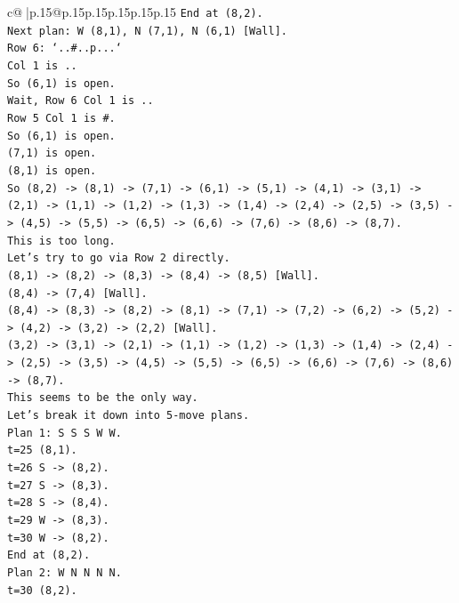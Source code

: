 \documentclass{article}
\begin{document}
{\begin{supertabular}{c@{$\;$}|p{.15\linewidth}@{}p{.15\linewidth}p{.15\linewidth}p{.15\linewidth}p{.15\linewidth}p{.15\linewidth}}
{{{\texttt{End at (8,2).} \\
\texttt{Next plan: W (8,1), N (7,1), N (6,1) {[}Wall{]}.} \\
\texttt{Row 6: `..\#..p...`} \\
\texttt{Col 1 is ..} \\
\texttt{So (6,1) is open.} \\
\texttt{Wait, Row 6 Col 1 is ..} \\
\texttt{Row 5 Col 1 is \#.} \\
\texttt{So (6,1) is open.} \\
\texttt{(7,1) is open.} \\
\texttt{(8,1) is open.} \\
\texttt{So (8,2) {-}> (8,1) {-}> (7,1) {-}> (6,1) {-}> (5,1) {-}> (4,1) {-}> (3,1) {-}> (2,1) {-}> (1,1) {-}> (1,2) {-}> (1,3) {-}> (1,4) {-}> (2,4) {-}> (2,5) {-}> (3,5) {-}> (4,5) {-}> (5,5) {-}> (6,5) {-}> (6,6) {-}> (7,6) {-}> (8,6) {-}> (8,7).} \\
\texttt{This is too long.} \\
\texttt{Let's try to go via Row 2 directly.} \\
\texttt{(8,1) {-}> (8,2) {-}> (8,3) {-}> (8,4) {-}> (8,5) {[}Wall{]}.} \\
\texttt{(8,4) {-}> (7,4) {[}Wall{]}.} \\
\texttt{(8,4) {-}> (8,3) {-}> (8,2) {-}> (8,1) {-}> (7,1) {-}> (7,2) {-}> (6,2) {-}> (5,2) {-}> (4,2) {-}> (3,2) {-}> (2,2) {[}Wall{]}.} \\
\texttt{(3,2) {-}> (3,1) {-}> (2,1) {-}> (1,1) {-}> (1,2) {-}> (1,3) {-}> (1,4) {-}> (2,4) {-}> (2,5) {-}> (3,5) {-}> (4,5) {-}> (5,5) {-}> (6,5) {-}> (6,6) {-}> (7,6) {-}> (8,6) {-}> (8,7).} \\
\texttt{This seems to be the only way.} \\
\texttt{Let's break it down into 5{-}move plans.} \\
\texttt{Plan 1: S S S W W.} \\
\texttt{t=25 (8,1).} \\
\texttt{t=26 S {-}> (8,2).} \\
\texttt{t=27 S {-}> (8,3).} \\
\texttt{t=28 S {-}> (8,4).} \\
\texttt{t=29 W {-}> (8,3).} \\
\texttt{t=30 W {-}> (8,2).} \\
\texttt{End at (8,2).} \\
\texttt{Plan 2: W N N N N.} \\
\texttt{t=30 (8,2).} \\
}}}
\end{supertabular}}
\end{document}
